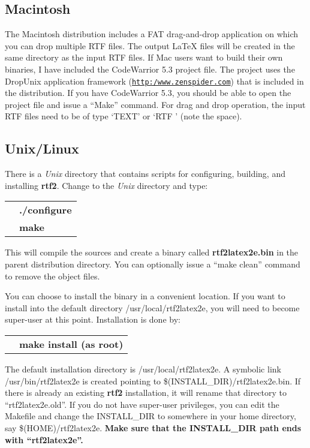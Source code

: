 \documentclass[11pt]{article}
\def\rtf2latex2e{{\bf rtf2\LaTeXe}}
\def\urlone#1{\mbox{\href{#1}{\tt #1}}}
\begin{document}
\subsection{Macintosh}
The Macintosh distribution includes a FAT drag-and-drop application on
which you can drop multiple RTF files.  The output {\LaTeX} files will
be created in the same directory as the input RTF files.  If Mac users
want to build their own binaries, I have included the CodeWarrior 5.3
project file.  The project uses the DropUnix application framework
(\urlone{http:/www.zenspider.com}) that is included in the distribution.
 If you have CodeWarrior 5.3, you should be able to open the project
file and issue a ``Make'' command. For drag and drop operation, the
input RTF files need to be of type `TEXT' or `RTF ' (note the space).

\subsection{Unix/Linux \label{Unix_install}}
There is a \textit{Unix} directory that contains scripts for
configuring, building, and installing \rtf2latex2e. Change to the
\textit{Unix} directory and type:\\
\begin{tabular}{ll}
&\textbf{./configure}\\
&\textbf{make}
\end{tabular}

\noindent
This will compile the sources and create a binary called
\textbf{rtf2latex2e.bin} in the parent distribution directory. You can
optionally issue a ``make clean'' command to remove the object files.

You can choose to install the binary in a convenient location.
If you want to install into the default directory
/usr/local/rtf2latex2e, you will need to become super-user at this point.
Installation is done by:\\
\begin{tabular}{ll}
&\textbf{make install (as root)}
\end{tabular}

\noindent
The default installation directory is /usr/local/rtf2latex2e.  A
symbolic link /usr/bin/rtf2latex2e is created pointing to
\$(INSTALL\_DIR)/rtf2latex2e.bin. If there is already an existing
\rtf2latex2e installation, it will rename that directory to
``rtf2latex2e.old''. If you do not have super-user privileges, you can
edit the Makefile and change the INSTALL\_DIR to somewhere in your home
directory, say \$(HOME)/rtf2latex2e. \textbf{Make sure that the
INSTALL\_DIR path ends with ``rtf2latex2e''.}
\end{document}
